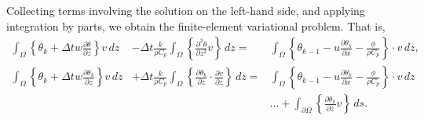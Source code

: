 \documentclass[12pt]{amsart}
\begin{document}
Collecting terms involving the solution on the left-hand side, and applying integration by parts, we obtain the finite-element variational problem.  That is,
\begin{align*}
  \int_\Omega \left\{
    \theta_k 
    + \Delta t w \frac{\partial \theta}{\partial z} 
  \right\} v\, dz 
    &- \Delta t \frac{k}{\rho C_p} 
  \int_\Omega \left\{
    \frac{\partial^2 \theta}{\partial z^2}
  v\right\} \, dz
  =& 
  \int_\Omega\left\{\theta_{k-1} - u\frac{\partial \theta_k}{\partial x} - \frac{\phi}{\rho C_p} \right\}\cdot v\, dz, \\  
  \int_\Omega \left\{
    \theta_k 
    + \Delta t w \frac{\partial \theta_k}{\partial z} 
  \right\} v\, dz 
    &+ \Delta t \frac{k}{\rho C_p} 
  \int_\Omega \left\{
    \frac{\partial\theta_k}{\partial z}
    \cdot \frac{\partial v}{\partial z}
    \right\} \, dz
  =& 
  \int_\Omega\left\{\theta_{k-1} - u\frac{\partial \theta_k}{\partial x} - \frac{\phi}{\rho C_p} \right\}\cdot v\, dz \\  
  & &\dots  + \int_{\partial \Omega} \left\{ \frac{\partial \theta_k}{\partial z} v \right\}\, ds.\\
  \end{align*}

\begin{thebibliography}{[1]}
\end{thebibliography}
\end{document}
